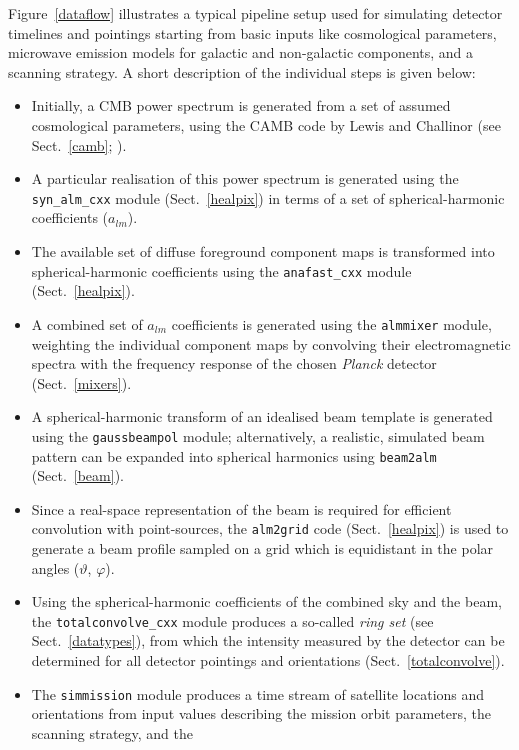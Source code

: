 \documentclass{aa}
\begin{document}
Figure~\ref{dataflow} illustrates a typical pipeline setup used for
simulating detector timelines and pointings starting from basic inputs
like cosmological parameters, microwave emission models for
galactic and non-galactic components, and a scanning strategy.
A short description of the individual steps is given below:
\begin{itemize}
  \item Initially, a CMB power spectrum is generated from a set of
    assumed cosmological parameters, using the CAMB code by Lewis and
    Challinor (see Sect.~\ref{camb}; \citealt{lewis-etal-2000}).
  \item A particular realisation of this power spectrum is generated
    using the {\tt syn\_alm\_cxx} module (Sect.~\ref{healpix}) in
    terms of a set of spherical-harmonic coefficients ($a_{lm}$).
  \item The available set of diffuse foreground component maps is
    transformed into spherical-harmonic coefficients using
    the {\tt anafast\_cxx} module (Sect.~\ref{healpix}).
  \item A combined set of $a_{lm}$ coefficients is generated using the
    {\tt almmixer} module, weighting the individual component maps by
    convolving their electromagnetic spectra with the frequency
    response of the chosen \emph{Planck} detector (Sect.~\ref{mixers}).
  \item A spherical-harmonic transform of an idealised beam template
    is generated using the {\tt gaussbeampol} module; alternatively, a
    realistic, simulated beam pattern can be expanded into spherical
    harmonics using {\tt beam2alm} (Sect.~\ref{beam}).
  \item Since a real-space representation of the beam is required for efficient
    convolution with point-sources, the {\tt alm2grid} code
   (Sect.~\ref{healpix}) is used to generate a beam
    profile sampled on a grid which is equidistant in the polar angles
    ($\vartheta$, $\varphi$).
  \item Using the spherical-harmonic coefficients of the combined sky
    and the beam, the {\tt totalconvolve\_cxx} module produces a
    so-called \emph{ring set} (see Sect.~\ref{datatypes}),
    from which the intensity measured by
    the detector can be determined for all detector pointings and
    orientations (Sect.~\ref{totalconvolve}).
  \item The {\tt simmission} module produces a time stream of
    satellite locations and orientations from input values describing
    the mission orbit parameters, the scanning strategy, and the

\end{itemize}
\end{document}
